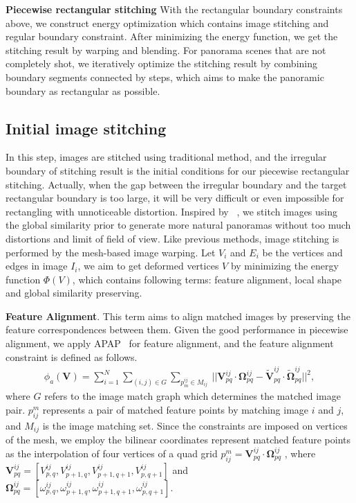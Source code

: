 \documentclass[10pt,journal,compsoc]{IEEEtran}
\begin{document}
\textbf{Piecewise rectangular stitching}
With the rectangular boundary constraints above, we construct energy optimization which contains image stitching and regular boundary constraint.
After minimizing the energy function, we get the stitching result by warping and blending.
For panorama scenes that are not completely shot, we iteratively optimize the stitching result by combining boundary segments connected by steps, 
which aims to make the panoramic boundary as rectangular as possible.

 \subsection{Initial image stitching}
 \label{sec:Initial image stitching}
 In this step, images are stitched using traditional method, and the irregular boundary of stitching result is the initial conditions for our piecewise rectangular stitching.
 Actually, when the gap between the irregular boundary and the target rectangular boundary is too large, it will be very difficult or even impossible for rectangling with unnoticeable distortion.
 Inspired by ~\cite{conf/eccv/ChenC16}, we stitch images using the global similarity prior to generate more natural panoramas without too much distortions and limit of field of view.
 Like previous methods, image stitching is performed by the mesh-based image warping.
 Let $V_i$ and $E_i$ be the vertices and edges in image $I_i$, we aim to get deformed vertices $V$ by minimizing the energy function $\Phi(V)$, which contains following terms:
feature alignment, local shape and global similarity preserving.

\textbf{Feature Alignment}.
This term aims to align matched images by preserving the feature correspondences between them.
Given the good performance in piecewise alignment, we apply APAP~\cite{journals/pami/ZaragozaCTBS14} for feature alignment, and the feature alignment constraint is defined as follows.
\begin{equation} \label{equ:feature_align}
\begin{split}
    \phi_a(\mathbf{V}) = \sum\limits_{i=1}^N\sum\limits_{(i, j)\in G}\sum\limits_{p^{ij}_m \in M_{ij}} \
    ||\mathbf{V}^{ij}_{pq} \cdot  \mathbf{\Omega}^{ij}_{pq} - \mathbf{\widetilde{V}}^{ij}_{pq} \cdot  \mathbf{\widetilde{\Omega}}^{ij}_{pq}||^2,
\end{split}
\end{equation}
where $G$ refers to the image match graph which determines the matched image pair.
$p_{ij}^m$ represents a pair of matched feature points by matching image $i$ and $j$, and $M_{ij}$ is the image matching set.
Since the constraints are imposed on vertices of the mesh, we employ the bilinear coordinates represent matched feature points as the interpolation of four vertices of a quad grid
$p_{ij}^m=\mathbf{V}^{ij}_{pq} \cdot  \mathbf{\Omega}^{ij}_{pq}$ , where $\mathbf{V}^{ij}_{pq}=[V^{ij}_{p,q},V^{ij}_{p+1,q},V^{ij}_{p+1,q+1},V^{ij}_{p,q+1}]$ and $\mathbf{\Omega}^{ij}_{pq}=[\omega^{ij}_{p,q},\omega^{ij}_{p+1,q},\omega^{ij}_{p+1,q+1},\omega^{ij}_{p,q+1}]$.
\end{document}
